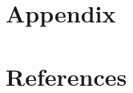 {%
\newpage
\section{Appendix}
\section{References}
\begingroup
\renewcommand{\section}[2]{}%


\endgroup



 








